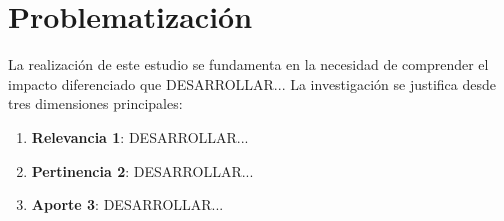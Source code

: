 \section{Problematización}

La realización de este estudio se fundamenta en la necesidad de comprender el impacto diferenciado que DESARROLLAR... La investigación se justifica desde tres dimensiones principales:

\begin{enumerate}
    \item \textbf{Relevancia 1}: DESARROLLAR...
    \item \textbf{Pertinencia 2}: DESARROLLAR...
    \item \textbf{Aporte 3}: DESARROLLAR...
\end{enumerate}